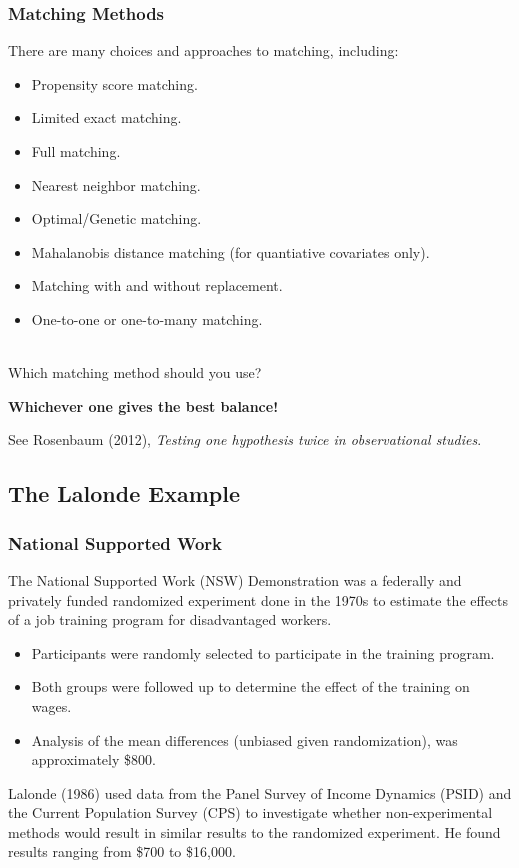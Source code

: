 \documentclass[10pt,slidestop,mathserif,c]{beamer}
\begin{document}
\begin{frame}
    \frametitle{Matching Methods}
    There are many choices and approaches to matching, including:
    \begin{itemize}
        \item Propensity score matching.
        \item Limited exact matching.
        \item Full matching.
        \item Nearest neighbor matching.
        \item Optimal/Genetic matching.
        \item Mahalanobis distance matching (for quantiative covariates only).
        \item Matching with and without replacement.
        \item One-to-one or one-to-many matching.
    \end{itemize}
    \ \\
    Which matching method should you use?
    \pause
    \begin{center} \textbf{Whichever one gives the best balance!} \end{center}
    See Rosenbaum (2012), \textit{Testing one hypothesis twice in observational studies}.
\end{frame}

\subsection{The Lalonde Example}

\begin{frame}
    \frametitle{National Supported Work}
    
    The National Supported Work (NSW) Demonstration was a federally and privately funded randomized experiment done in the 1970s to estimate the effects of a job training program for disadvantaged workers.
    
    \begin{itemize}
        \item Participants were randomly selected to participate in the training program.
        \item Both groups were followed up to determine the effect of the training on wages.
        \item Analysis of the mean differences (unbiased given randomization), was approximately \$800.
    \end{itemize}
    
    Lalonde (1986) used data from the Panel Survey of Income Dynamics (PSID) and the Current Population Survey (CPS) to investigate whether non-experimental methods would result in similar results to the randomized experiment. He found results ranging from \$700 to \$16,000.
\end{frame}
\end{document}
